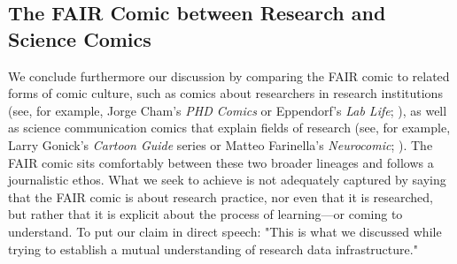 \documentclass{inggrid}
\begin{document}
\subsection{The FAIR Comic between Research and Science Comics}
We conclude furthermore our discussion by comparing the FAIR comic to related forms of comic culture, such as comics about researchers in research institutions (see, for example, Jorge Cham's \textit{PHD Comics} or Eppendorf’s \textit{Lab Life}; \cite{cham_phd_1997, noauthor_lab_nodate}), as well as science communication comics that explain fields of research (see, for example, Larry Gonick's \textit{Cartoon Guide} series or Matteo Farinella's \textit{Neurocomic}; \cite{gonick_cartoon_1983-1, gonick_cartoon_1983, farinelli_neurocomic_2013}). The FAIR comic sits comfortably between these two broader lineages and follows a journalistic ethos. What we seek to achieve is not adequately captured by saying that the FAIR comic is about research practice, nor even that it is researched, but rather that it is explicit about the process of learning---or coming to understand. To put our claim in direct speech: "This is what we discussed while trying to establish a mutual understanding of research data infrastructure."%
%
%


%
%
%
%
%
\end{document}
